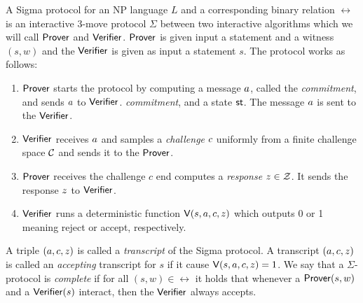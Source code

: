 \begin{definition} A Sigma protocol for an NP language $L$ and a corresponding binary relation $\rel$ is an interactive 3-move protocol $\Sigma$ between two interactive algorithms which we will call $\mathsf{Prover}$ and $\mathsf{Verifier}$. $\mathsf{Prover}$ is given input a statement and a witness $(s, w)$ and the $\mathsf{Verifier}$ is given as input a statement $s$. The protocol works as follows:
\begin{enumerate}
\item $\mathsf{Prover}$ starts the protocol by computing a message $a$, called the \emph{commitment}, and sends $a$ to $\mathsf{Verifier}$. \emph{commitment}, and a state $\mathsf{st}$. The message $a$ is sent to the $\mathsf{Verifier}$.
\item $\mathsf{Verifier}$ receives $a$ and samples a \emph{challenge} $c$ uniformly from a finite challenge space $\mathcal{C}$ and sends it to the $\mathsf{Prover}$.
\item $\mathsf{Prover}$ receives the challenge $c$ end computes a \emph{response} $z \in \mathcal{Z}$. It sends the response $z$ to $\mathsf{Verifier}$.
\item $\mathsf{Verifier}$ runs a deterministic function $\mathsf{V}(s,a,c,z)$ which outputs 0 or 1 meaning reject or accept, respectively.
\end{enumerate}
A triple $(a,c,z)$ is called a \emph{transcript} of the Sigma protocol. A transcript $(a,c,z)$ is called an \emph{accepting} transcript for $s$ if it cause $\mathsf{V}(s,a,c,z) =1$. 
We say that a $\Sigma$-protocol is \emph{complete} if for all $(s, w) \in \rel$ it holds that whenever a $\mathsf{Prover}(s,w)$ and a $\mathsf{Verifier}(s)$ interact, then the $\mathsf{Verifier}$ always accepts. 
\end{definition}



